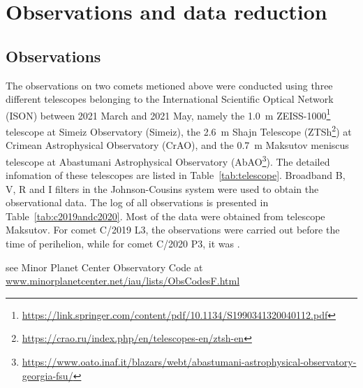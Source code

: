 \section{Observations and data reduction} \label{sec:obs_data}

\subsection{Observations}

The observations on two comets metioned above were conducted using three different telescopes belonging to the International Scientific Optical Network (ISON) between 2021 March and 2021 May, namely the {\qty{1.0}{\m}} ZEISS-1000\footnote{\url{https://link.springer.com/content/pdf/10.1134/S1990341320040112.pdf}} 
telescope at Simeiz Observatory (Simeiz), the {\qty{2.6}{\m}} Shajn Telescope (ZTSh\footnote{\url{https://crao.ru/index.php/en/telescopes-en/ztsh-en}}) 
at Crimean Astrophysical Observatory (CrAO), and the {\qty{0.7}{\m}} Maksutov meniscus telescope at Abastumani Astrophysical Observatory (AbAO\footnote{\url{https://www.oato.inaf.it/blazars/webt/abastumani-astrophysical-observatory-georgia-fsu/}}). 
The detailed infomation of these telescopes are listed in Table~\ref{tab:telescope}. Broadband B, V, R and I filters in the Johnson-Cousins system were used to obtain the observational data. The log of all observations is presented in Table~\ref{tab:c2019andc2020}. Most of the data were obtained from telescope Maksutov. For comet C/2019 L3, the observations were carried out before the time of perihelion, while for comet C/2020 P3, it was . 

\begin{table}
    \centering
    \caption{Information of instrunments used. }\label{tab:telescope}
    \begin{threeparttable}
        \begin{tablenotes}
            \item[1] see Minor Planet Center Observatory Code at \\
            \url{www.minorplanetcenter.net/iau/lists/ObsCodesF.html}
        \end{tablenotes}
    \end{threeparttable}
\end{table}

